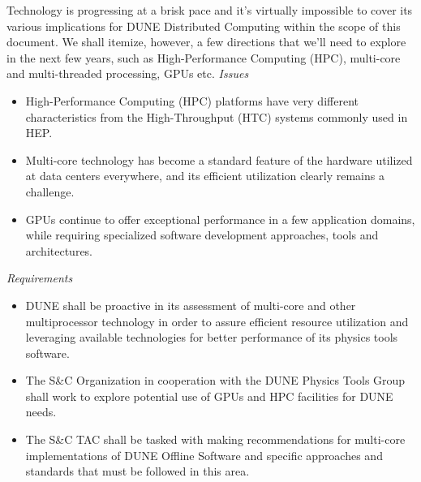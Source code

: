 \noindent
Technology is progressing at a brisk pace and it's virtually impossible to cover its various implications for DUNE Distributed Computing within the scope of this document. We shall itemize, however, a few directions that we'll need to explore in the next few years, such as High-Performance Computing (HPC), multi-core and multi-threaded processing, GPUs etc.
\noindent
\textit{Issues}
\begin{itemize}
	\item High-Performance Computing (HPC) platforms have very different characteristics from the High-Throughput (HTC) systems commonly used in HEP.
	
	\item Multi-core technology has become a standard feature of the hardware utilized at data centers everywhere, and its efficient utilization clearly remains a challenge.
	
	\item GPUs continue to offer exceptional performance in a few application domains, while requiring specialized software development approaches, tools and architectures.
	
\end{itemize}
\noindent
\textit{Requirements}
\begin{itemize}
	\item DUNE shall be proactive in its assessment of multi-core and other multiprocessor technology in order to assure efficient
	resource utilization and leveraging available technologies for better performance of its physics tools software.
	
	\item The S\&C Organization in cooperation with the DUNE Physics Tools Group shall work to explore potential use of GPUs and HPC facilities for DUNE needs.
	
	\item The S\&C TAC shall be tasked with making recommendations for multi-core implementations of DUNE Offline Software
	and specific approaches and standards that must be followed in this area.
	
\end{itemize}

